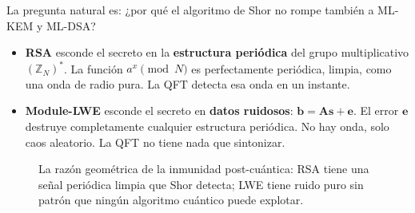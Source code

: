 La pregunta natural es: ¿por qué el algoritmo de Shor no rompe también a ML-KEM y ML-DSA?

\begin{intuicion}
\begin{itemize}
  \item \textbf{RSA} esconde el secreto en la \textbf{estructura periódica} del grupo multiplicativo $(\mathbb{Z}_N)^*$. La función $a^x \pmod N$ es perfectamente periódica, limpia, como una onda de radio pura. La QFT detecta esa onda en un instante.
  
  \item \textbf{Module-LWE} esconde el secreto en \textbf{datos ruidosos}: $\mathbf{b} = \mathbf{As} + \mathbf{e}$. El error $\mathbf{e}$ destruye completamente cualquier estructura periódica. No hay onda, solo caos aleatorio. La QFT no tiene nada que sintonizar.
\end{itemize}
\end{intuicion}

\begin{figure}[htbp]
\centering
{}
\caption{La razón geométrica de la inmunidad post-cuántica: RSA tiene una señal periódica limpia que Shor detecta; LWE tiene ruido puro sin patrón que ningún algoritmo cuántico puede explotar.}
\label{fig:rsa_vs_lwe_shor}
\end{figure}

